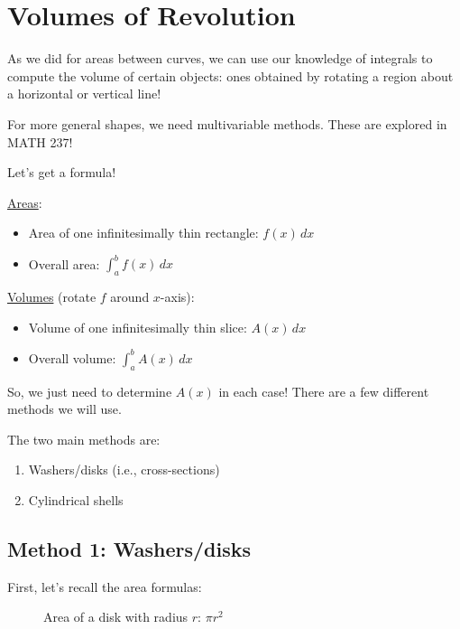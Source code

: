 \section{Volumes of Revolution}
As we did for areas between curves, we can use our knowledge of
integrals to compute the volume of certain objects: ones obtained
by rotating a region about a horizontal or vertical line!

\begin{Remark}{}{}
    For more general shapes, we need multivariable methods. These are
    explored in MATH 237!
\end{Remark}

Let's get a formula!

\underline{Areas}:
\begin{itemize}
    \item Area of one infinitesimally thin rectangle: $ f(x)\,dx $
    \item Overall area: $ \displaystyle \int_{a}^{b} f(x)\, d{x}  $
\end{itemize}
\underline{Volumes} (rotate $ f $ around $ x $-axis):
\begin{itemize}
    \item Volume of one infinitesimally thin slice: $ A(x)\,dx $
    \item Overall volume: $ \displaystyle \int_{a}^{b} A(x)\, d{x} $
\end{itemize}

So, we just need to determine $ A(x) $ in each case! There are
a few different methods we will use.

The two main methods are:
\begin{enumerate}[label=(\Roman*)]
    \item Washers/disks (i.e., cross-sections)
    \item Cylindrical shells
\end{enumerate}

\subsection*{Method 1: Washers/disks}

First, let's recall the area formulas:

\begin{figure}
    \centering
    \caption{Area of a disk with radius $ r $: $ \pi r^2 $}
\end{figure}

